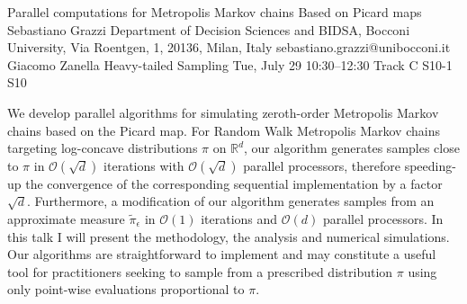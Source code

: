 \begin{talk}
  {Parallel computations for Metropolis Markov chains Based on Picard maps}%
  {Sebastiano Grazzi}%
  {Department of Decision Sciences and BIDSA, Bocconi University, Via Roentgen, 1, 20136, Milan, Italy}%
  {sebastiano.grazzi@unibocconi.it}%
  {Giacomo Zanella}%
  {Heavy-tailed Sampling}%
  {Tue, July 29 10:30–12:30 Track C}%
  {S10-1}%
  {S10}%
				
			

 We develop parallel algorithms for simulating zeroth-order Metropolis Markov chains based on the Picard map. 
For Random Walk Metropolis Markov chains targeting log-concave distributions $\pi$ on $\mathbb{R}^d$, our algorithm  
generates samples %
close to $\pi$ %
in $\mathcal{O}(\sqrt{d})$ iterations with $\mathcal{O}(\sqrt{d})$ parallel processors, 
therefore speeding-up the convergence of the corresponding sequential implementation by a factor $\sqrt{d}$. Furthermore, a modification of our algorithm generates samples from an approximate measure $\tilde \pi_\epsilon$ in $\mathcal{O}(1)$ iterations and $\mathcal{O}(d)$ parallel processors. In this talk I will present the methodology, the analysis and numerical simulations. Our algorithms are straightforward to implement and may constitute a useful tool for practitioners seeking to sample from a prescribed distribution $\pi$ using only point-wise evaluations proportional to $\pi$.
\end{talk}


